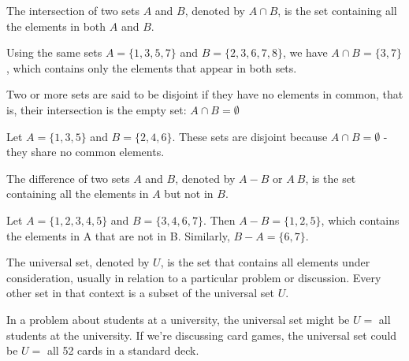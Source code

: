 \documentclass[12pt]{article}
\begin{document}
\begin{definition}[Intersection]
    The intersection of two sets $A$ and $B$, denoted by $A \cap B$, is the set containing all the elements in both $A$ and $B$.
\end{definition}


Using the same sets $A = \{1, 3, 5, 7\}$ and $B = \{2, 3, 6, 7, 8\}$, we have $A \cap B = \{3, 7\}$, which contains only the elements that appear in both sets.



\vspace{12pt}


\begin{corollary}
    Two or more sets are said to be disjoint if they have no elements in common, that is, their intersection is the empty set: $A \cap B = \emptyset$
\end{corollary}


Let $A = \{1, 3, 5\}$ and $B = \{2, 4, 6\}$. These sets are disjoint because $A \cap B = \emptyset$ - they share no common elements.



\vspace{12pt}


\begin{definition}[Difference]
    The difference of two sets $A$ and $B$, denoted by $A - B$ or $A \ B$, is the set containing all the elements in $A$ but not in $B$.
\end{definition}


Let $A = \{1, 2, 3, 4, 5\}$ and $B = \{3, 4, 6, 7\}$. Then $A - B = \{1, 2, 5\}$, which contains the elements in A that are not in B. Similarly, $B - A = \{6, 7\}$.


\vspace{12pt}



\begin{definition}
    The universal set, denoted by $U$, is the set that contains all elements under consideration, usually in relation to a particular problem or discussion. Every other set in that context is a subset of the universal set $U$.
\end{definition}

In a problem about students at a university, the universal set might be $U = $ all students at the university. If we're discussing card games, the universal set could be $U = $ all 52 cards in a standard deck.
\end{document}

